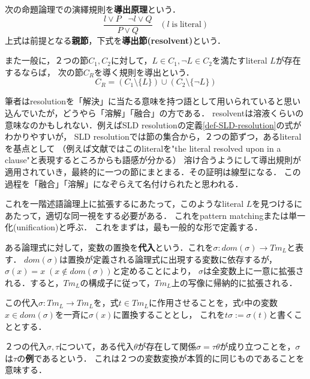 \documentclass[uplatex,dvipdfmx]{jsarticle}
\begin{document}
\begin{definition}[導出：命題論理]
    次の命題論理での演繹規則を\textbf{導出原理}という．
    \[ \frac{l\lor P\;\;\;\lnot l\lor Q}{P\lor Q}\;\;\;(l\mathrm{\;is\;literal}) \]
    上式は前提となる\textbf{親節}，下式を\textbf{導出節(resolvent)}という．

    また一般に，２つの節$C_1,C_2$に対して，$L\in C_1,\lnot L\in C_2$を満たすliteral $L$が存在するならば，
    次の節$C_R$を導く規則を導出という．
    \[ C_R = (C_1\setminus\{L\})\cup(C_2\setminus\{\lnot L\}) \]
\end{definition}
\begin{remark}
    筆者はresolutionを「解決」に当たる意味を持つ語として用いられていると思い込んでいたが，どうやら「溶解」「融合」の方である．
    resolventは溶液くらいの意味なのかもしれない．例えばSLD resolutionの定義\ref{def-SLD-resolution}の式がわかりやすいが，
    SLD resolutionでは節の集合から，２つの節ずつ，あるliteralを基点として
    （例えば文献\cite{SLD-resolution}ではこのliteralを"the literal resolved upon in a clause"と表現するところからも語感が分かる）
    溶け合うようにして導出規則が適用されていき，最終的に一つの節にまとまる．その証明は線型になる．
    この過程を「融合」「溶解」になぞらえて名付けられたと思われる．
\end{remark}

これを一階述語論理上に拡張するにあたって，このようなliteral $L$を見つけるにあたって，適切な同一視をする必要がある．
これをpattern matchingまたは単一化(unification)と呼ぶ．
これをまずは，最も一般的な形で定義する．

\begin{definition}[substitution]
    ある論理式に対して，変数の置換を\textbf{代入}という．これを$\sigma:dom(\sigma)\to Tm_L$と表す．
    $dom(\sigma)$は置換が定義される論理式に出現する変数に依存するが，$\sigma(x)=x\;(x\notin dom(\sigma))$と定めることにより，
    $\sigma$は全変数上に一意に拡張される．すると，$Tm_L$の構成子に従って，$Tm_L$上の写像に帰納的に拡張される．

    この代入$\sigma:Tm_L\to Tm_L$を，式$t\in Tm_L$に作用させることを，式$t$中の変数$x\in dom(\sigma)$を一斉に$\sigma(x)$に置換することとし，
    これを$t\sigma:=\sigma(t)$と書くこととする．
\end{definition}

\begin{definition}[instance]
    ２つの代入$\sigma,\tau$について，ある代入$\theta$が存在して関係$\sigma=\tau\theta$が成り立つことを，$\sigma$は$\tau$の\textbf{例}であるという．
    これは２つの変数変換が本質的に同じものであることを意味する．
\end{definition}
\end{document}
